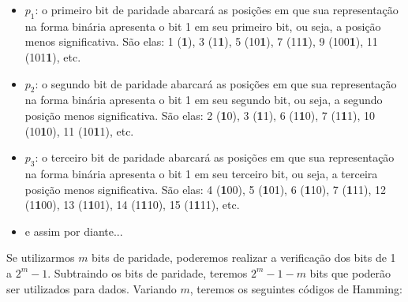 \begin{frame}[allowframebreaks]
\begin{itemize}
\item $p_1$: o primeiro bit de paridade abarcará as posições em que sua representação
	na forma binária apresenta o bit 1 em seu primeiro bit, ou seja, a posição menos significativa.
	São elas: 1 (\textbf{1}), 3 (1\textbf{1}), 5 (10\textbf{1}), 7 (11\textbf{1}), 9 (100\textbf{1}),
	11 (101\textbf{1}), etc.
\item $p_2$: o segundo bit de paridade abarcará as posições em que sua representação
        na forma binária apresenta o bit 1 em seu segundo bit, ou seja, a segundo posição menos significativa.
	São elas: 2 (\textbf{1}0), 3 (\textbf{1}1), 6 (1\textbf{1}0), 7 (1\textbf{1}1), 10 (10\textbf{1}0),
	11 (10\textbf{1}1), etc.
\item $p_3$: o terceiro bit de paridade abarcará as posições em que sua representação
        na forma binária apresenta o bit 1 em seu terceiro bit, ou seja, a terceira posição menos significativa.
	São elas: 4 (\textbf{1}00), 5 (\textbf{1}01), 6 (\textbf{1}10), 7 (\textbf{1}11), 12 (1\textbf{1}00),
	13 (1\textbf{1}01), 14 (1\textbf{1}10), 15 (1\textbf{1}11), etc.
\item e assim por diante...
\end{itemize}

Se utilizarmos $m$ bits de paridade, poderemos realizar a verificação dos bits de 1 a $2^m - 1$.
Subtraindo os bits de paridade, teremos $2^m - 1 - m$ bits que poderão ser utilizados para dados.
Variando $m$, teremos os seguintes códigos de Hamming:


\end{frame}



